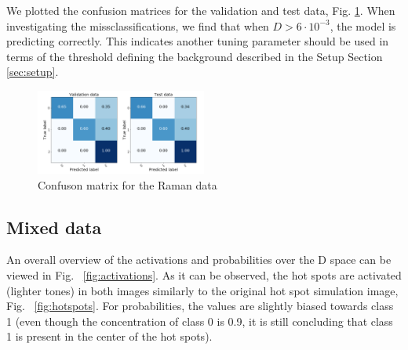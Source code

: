 \documentclass{article}
\begin{document}
We plotted the confusion matrices for the validation and test data, Fig. \ref{fig:confusion}. When investigating the missclassifications, we find that when $D > 6\cdot 10^{-3}$, the model is predicting correctly. This indicates another tuning parameter should be used in terms of the threshold defining the background described in the Setup Section \ref{sec:setup}.



\begin{figure}[H]
	\centering
	\includegraphics[width=0.5\textwidth]{raman_sim_3_conf_matrix13_2.png}
	\caption{Confuson matrix for the Raman data}
	\label{fig:confusion}
\end{figure}

\subsection{Mixed data}

An overall overview of the activations and probabilities over the D space can be viewed in Fig. ~\ref{fig:activations}. As it can be observed, the hot spots are activated (lighter tones) in both images similarly to the original hot spot simulation image, Fig. ~\ref{fig:hotspots}. For probabilities, the values are slightly biased towards class 1 (even though the concentration of class 0 is 0.9, it is still concluding that class 1 is present in the center of the hot spots). %
\end{document}
